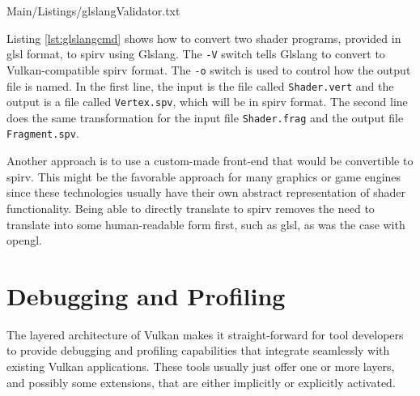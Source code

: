 
    
    {Main/Listings/glslangValidator.txt}

    Listing \ref{lst:glslangcmd} shows how to convert two shader programs, provided in \gls{glsl} format, to \gls{spirv} using Glslang.
    The \lstinline{-V} switch tells Glslang to convert to Vulkan-compatible \gls{spirv} format.
    The \lstinline{-o} switch is used to control how the output file is named.
    In the first line, the input is the file called \lstinline{Shader.vert} and the output is a file called \lstinline{Vertex.spv}, which will be in \gls{spirv} format.
    The second line does the same transformation for the input file \lstinline{Shader.frag} and the output file \lstinline{Fragment.spv}.

    Another approach is to use a custom-made front-end that would be convertible to \gls{spirv}.
    This might be the favorable approach for many graphics or game engines since these technologies usually have their own abstract representation of shader functionality.
    Being able to directly translate to \gls{spirv} removes the need to translate into some human-readable form first, such as \gls{glsl}, as was the case with \gls{opengl}.


  \section{Debugging and Profiling}
  \label{sec:DebuggingAndProfiling}
    The layered architecture of Vulkan makes it straight-forward for tool developers to provide debugging and profiling capabilities that integrate seamlessly with existing Vulkan applications.
    These tools usually just offer one or more layers, and possibly some extensions, that are either implicitly or explicitly activated.

